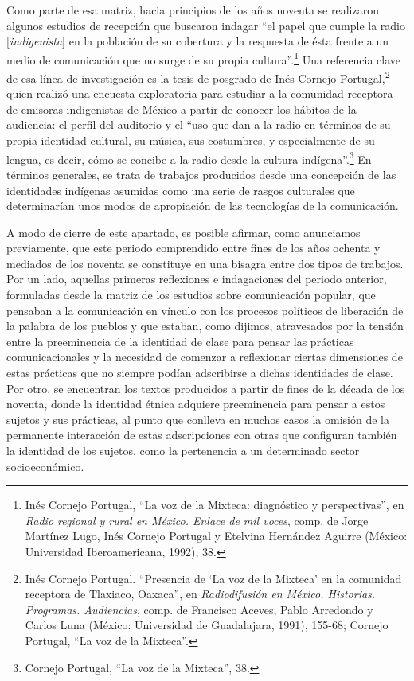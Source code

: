 \documentclass{tufte-handout}
\begin{document}
Como parte de esa matriz, hacia principios de los años noventa se
realizaron algunos estudios de recepción que buscaron indagar ``el papel
que cumple la radio {[}\emph{indigenista}{]} en la población de su
cobertura y la respuesta de ésta frente a un medio de comunicación que
no surge de su propia cultura''.\footnote{Inés Cornejo Portugal, ``La
  voz de la Mixteca: diagnóstico y perspectivas'', en \emph{Radio
  regional y rural en México. Enlace de mil voces}, comp. de Jorge
  Martínez Lugo, Inés Cornejo Portugal y Etelvina Hernández Aguirre
  (México: Universidad Iberoamericana, 1992), 38.} Una referencia clave
de esa línea de investigación es la tesis de posgrado de Inés Cornejo
Portugal,\footnote{Inés Cornejo Portugal. ``Presencia de `La voz de la
  Mixteca' en la comunidad receptora de Tlaxiaco, Oaxaca'', en
  \emph{Radiodifusión en México. Historias. Programas. Audiencias},
  comp. de Francisco Aceves, Pablo Arredondo y Carlos Luna (México:
  Universidad de Guadalajara, 1991), 155-68; Cornejo Portugal, ``La voz
  de la Mixteca''.} quien realizó una encuesta exploratoria para
estudiar a la comunidad receptora de emisoras indigenistas de México a
partir de conocer los hábitos de la audiencia: el perfil del auditorio y
el ``uso que dan a la radio en términos de su propia identidad cultural,
su música, sus costumbres, y especialmente de su lengua, es decir, cómo
se concibe a la radio desde la cultura indígena''.\footnote{Cornejo
  Portugal, ``La voz de la Mixteca'', 38.} En términos generales, se
trata de trabajos producidos desde una concepción de las identidades
indígenas asumidas como una serie de rasgos culturales que determinarían
unos modos de apropiación de las tecnologías de la comunicación.

A modo de cierre de este apartado, es posible afirmar, como anunciamos
previamente, que este periodo comprendido entre fines de los años
ochenta y mediados de los noventa se constituye en una bisagra entre dos
tipos de trabajos. Por un lado, aquellas primeras reflexiones e
indagaciones del periodo anterior, formuladas desde la matriz de los
estudios sobre comunicación popular, que pensaban a la comunicación en
vínculo con los procesos políticos de liberación de la palabra de los
pueblos y que estaban, como dijimos, atravesados por la tensión entre la
preeminencia de la identidad de clase para pensar las prácticas
comunicacionales y la necesidad de comenzar a reflexionar ciertas
dimensiones de estas prácticas que no siempre podían adscribirse a
dichas identidades de clase. Por otro, se encuentran los textos
producidos a partir de fines de la década de los noventa, donde la
identidad étnica adquiere preeminencia para pensar a estos sujetos y sus
prácticas, al punto que conlleva en muchos casos la omisión de la
permanente interacción de estas adscripciones con otras que configuran
también la identidad de los sujetos, como la pertenencia a un
determinado sector socioeconómico.
\end{document}
